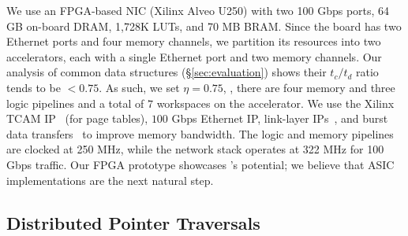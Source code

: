  We use an FPGA-based NIC (Xilinx Alveo U250) with two 100 Gbps ports, 64 GB on-board DRAM, 1,728K LUTs, and 70 MB BRAM. Since the board has two Ethernet ports and four memory channels, we partition its resources into two \pulse accelerators, each with a single Ethernet port and two memory channels. Our analysis of common data structures (\S\ref{sec:evaluation}) shows their $t_c/t_d$ ratio tends to be $<0.75$. As such, we set $\eta=0.75$, \ie, there are four memory and three logic pipelines and a total of $7$ workspaces on the accelerator.
We use the Xilinx TCAM IP~\cite{tcam_ip} (for page tables), $100$ Gbps Ethernet IP, link-layer IPs~\cite{xilinx_network}, and burst data transfers~\cite{burstdatatransfer} to improve memory bandwidth. The logic and memory pipelines are clocked at 250 MHz, while the network stack operates at 322 MHz for 100 Gbps traffic. Our FPGA prototype showcases \pulse's potential; we believe that ASIC implementations are the next natural step. 



\subsection{Distributed Pointer Traversals}
\label{ssec:distributed}


